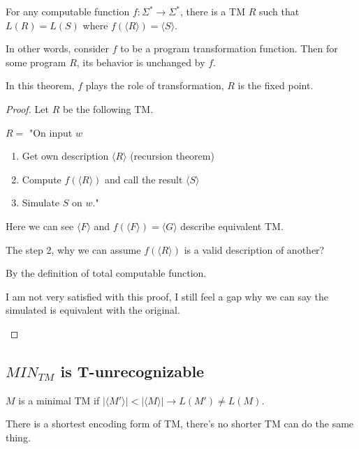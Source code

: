     \begin{theorem}
        For any computable function \(f: \Sigma^* \rightarrow \Sigma^*\), there is a TM \(R\) such that \(L(R) = L(S)\) where \(f(\langle R \rangle) = \langle S \rangle\).
        
        In other words, consider \(f\) to be a program transformation function. 
        Then for some program \(R\), its behavior is unchanged by \(f\). 

        In this theorem, \(f\) plays the role of transformation, \(R\) is the fixed point.  
    \end{theorem}
    \begin{proof}
        Let \(R\) be the following TM. 

        \(R = \) "On input \(w\)  
        \begin{enumerate}
            \item Get own description \(\langle R \rangle\) (recursion theorem)
            \item Compute \(f(\langle R \rangle)\) and call the result \(\langle S \rangle\) 
            \item Simulate \(S\) on \(w\)."    
        \end{enumerate}

        Here we can see \(\langle F \rangle\) and \(f(\langle F \rangle) = \langle G \rangle\) describe equivalent TM. 

        \begin{note}
            The step 2, why we can assume \(f(\langle R \rangle)\) is a valid description of another?

            By the definition of total computable function.
        \end{note}

        \begin{note}
            I am not very satisfied with this proof, I still feel a gap why we can say the simulated is equivalent with the original.
        \end{note}
    \end{proof}

\subsection{\(MIN_{TM}\) is T-unrecognizable}

\begin{definition}
    \(M\) is a minimal TM if \(|\langle M' \rangle| < |\langle M \rangle| \rightarrow L(M') \neq L(M)\). 
    \begin{remark}
        There is a shortest encoding form of TM, there's no shorter TM can do the same thing.
    \end{remark}
\end{definition}

